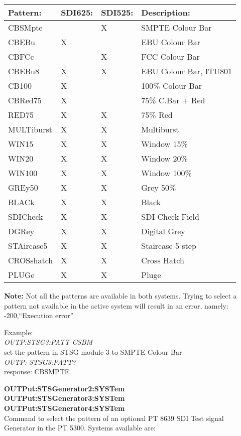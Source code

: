 \begin{tabular}{|l|l|l|l|}
\hline
\textbf{Pattern:}	& \textbf{SDI625:}	& \textbf{SDI525:}	& \textbf{Description:} \\ \hline
CBSMpte						& 	& X	& SMPTE Colour Bar\\ \hline
CBEBu							& X &		& EBU Colour Bar\\ \hline
CBFCc							& 	& X & FCC Colour Bar\\ \hline
CBEBu8						& X & X	& EBU Colour Bar, ITU801\\ \hline
CB100							& X &		& 100\% Colour Bar\\ \hline
CBRed75						& X & 	& 75\% C.Bar + Red\\ \hline
RED75							& X & X	& 75\% Red\\ \hline
MULTiburst				& X & X	& Multiburst\\ \hline
WIN15							& X & X	& Window 15\%\\ \hline
WIN20							& X & X & Window 20\%\\ \hline
WIN100						& X & X & Window 100\%\\ \hline
GREy50						& X & X & Grey 50\%\\ \hline
BLACk							& X & X & Black\\ \hline
SDICheck					& X & X & SDI Check Field\\ \hline
DGRey							& X & X & Digital Grey\\ \hline
STAircase5				& X & X & Staircase 5 step\\ \hline
CROSshatch				& X & X & Cross Hatch\\ \hline
PLUGe							& X & X & Pluge\\ \hline
\end{tabular}

\textbf{Note:} Not all the patterns are available in both systems. Trying to select a pattern not available in the active system will result in an error, namely: -200,``Execution error''

Example:\\
\textit{OUTP:STSG3:PATT CSBM}\\
set the pattern in STSG module 3 to SMPTE Colour Bar\\
\textit{OUTP: STSG3:PATT?}\\
response: CBSMPTE

\textbf{OUTPut:STSGenerator2:SYSTem}\\
\textbf{OUTPut:STSGenerator3:SYSTem}\\
\textbf{OUTPut:STSGenerator4:SYSTem}\\
Command to select the pattern of an optional PT 8639 SDI Test signal Generator in the PT 5300. Systems available are:

